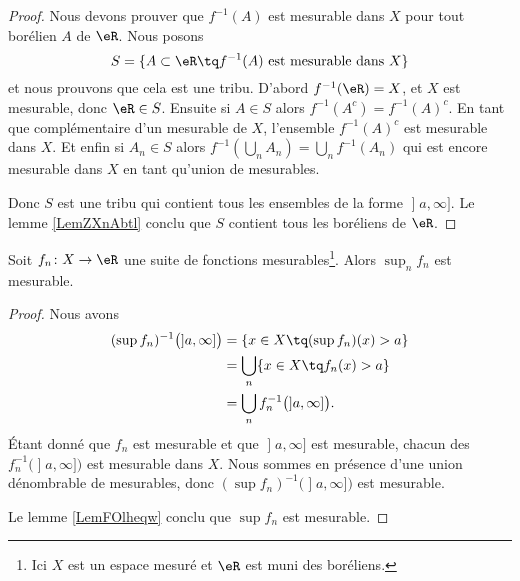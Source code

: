 \begin{proof}
    Nous devons prouver que \( f^{-1}(A)\) est mesurable dans \( X\) pour tout borélien \( A\) de \( \eR\). Nous posons
    \begin{equation}
        S=\{ A\subset \eR\tq f^{-1}(A)\text{ est mesurable dans \( X\)} \}
    \end{equation}
    et nous prouvons que cela est une tribu. D'abord \( f^{-1}(\eR)=X\), et \( X\) est mesurable, donc \( \eR\in S\). Ensuite si \( A\in S\) alors \( f^{-1}(A^c)=f^{-1}(A)^c\). En tant que complémentaire d'un mesurable de \( X\), l'ensemble \( f^{-1}(A)^c\) est mesurable dans \( X\). Et enfin si \( A_n\in S \) alors \( f^{-1}(\bigcup_nA_n)=\bigcup_nf^{-1}(A_n)\) qui est encore mesurable dans \( X\) en tant qu'union de mesurables.

    Donc \( S\) est une tribu qui contient tous les ensembles de la forme \( \mathopen] a , \infty \mathclose]\). Le lemme \ref{LemZXnAbtl} conclu que \( S\) contient tous les boréliens de \( \eR\).
\end{proof}

\begin{lemma}   \label{LemIGKvbNR}
    Soit \( f_n\colon X\to \eR\) une suite de fonctions mesurables\footnote{Ici \( X\) est un espace mesuré et \( \eR\) est muni des boréliens.}. Alors \( \sup_n f_n\) est mesurable.
\end{lemma}

\begin{proof}
    Nous avons
    \begin{subequations}
        \begin{align}
            (\sup f_n)^{-1}\big( \mathopen] a , \infty \mathclose] \big)&=\{ x\in X\tq (\sup f_n)(x)>a \}\\
            &=\bigcup_n\{ x\in X\tq f_n(x)>a \}\\
            &=\bigcup_nf_n^{-1}\big( \mathopen] a , \infty \mathclose] \big).
        \end{align}
    \end{subequations}
    Étant donné que \( f_n\) est mesurable et que \( \mathopen] a , \infty \mathclose]\) est mesurable, chacun des \( f_n^{-1}\big( \mathopen] a , \infty \mathclose] \big) \) est mesurable dans \( X\). Nous sommes en présence d'une union dénombrable de mesurables, donc \( (\sup f_n)^{-1}\big( \mathopen] a , \infty \mathclose] \big)\) est mesurable.

    Le lemme \ref{LemFOlheqw} conclu que \( \sup f_n\) est mesurable.
\end{proof}

